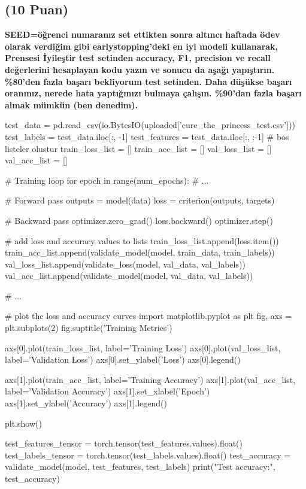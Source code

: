 \documentclass[11pt]{article}
\begin{document}
\newpage
\subsection{(10 Puan)} \textbf{SEED=öğrenci numaranız set ettikten sonra altıncı haftada ödev olarak verdiğim gibi earlystopping'deki en iyi modeli kullanarak, Prensesi İyileştir test setinden accuracy, F1, precision ve recall değerlerini hesaplayan kodu yazın ve sonucu da aşağı yapıştırın. \%80'den fazla başarı bekliyorum test setinden. Daha düşükse başarı oranınız, nerede hata yaptığınızı bulmaya çalışın. \%90'dan fazla başarı almak mümkün (ben denedim).}

\begin{python}

test_data = pd.read_csv(io.BytesIO(uploaded['cure_the_princess_test.csv']))
test_labels = test_data.iloc[:, -1]
test_features = test_data.iloc[:, :-1]
# bos listeler olustur
train_loss_list = []
train_acc_list = []
val_loss_list = []
val_acc_list = []

# Training loop
for epoch in range(num_epochs):
    # ...
    
    # Forward pass
    outputs = model(data)
    loss = criterion(outputs, targets)
    
    # Backward pass
    optimizer.zero_grad()
    loss.backward()
    optimizer.step()
    
    # add loss and accuracy values to lists
    train_loss_list.append(loss.item())
    train_acc_list.append(validate_model(model, train_data, train_labels))
    val_loss_list.append(validate_loss(model, val_data, val_labels))
    val_acc_list.append(validate_model(model, val_data, val_labels))
    
    # ...
    
# plot the loss and accuracy curves
import matplotlib.pyplot as plt
fig, axs = plt.subplots(2)
fig.suptitle('Training Metrics')

axs[0].plot(train_loss_list, label='Training Loss')
axs[0].plot(val_loss_list, label='Validation Loss')
axs[0].set_ylabel('Loss')
axs[0].legend()

axs[1].plot(train_acc_list, label='Training Accuracy')
axs[1].plot(val_acc_list, label='Validation Accuracy')
axs[1].set_xlabel('Epoch')
axs[1].set_ylabel('Accuracy')
axs[1].legend()

plt.show()

test_features_tensor = torch.tensor(test_features.values).float()
test_labels_tensor = torch.tensor(test_labels.values).float()
test_accuracy = validate_model(model, test_features, test_labels)
print("Test accuracy:", test_accuracy)

\end{python}
\end{document}
